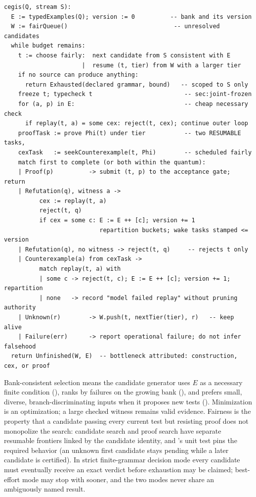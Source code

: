 \begin{lstlisting}
cegis(Q, stream S):
  E := typedExamples(Q); version := 0          -- bank and its version
  W := fairQueue()                              -- unresolved candidates
  while budget remains:
    t := choose fairly:  next candidate from S consistent with E
                      |  resume (t, tier) from W with a larger tier
    if no source can produce anything:
      return Exhausted(declared grammar, bound)   -- scoped to S only
    freeze t; typecheck t                          -- sec:joint-frozen
    for (a, p) in E:                               -- cheap necessary check
      if replay(t, a) = some cex: reject(t, cex); continue outer loop
    proofTask := prove Phi(t) under tier           -- two RESUMABLE tasks,
    cexTask   := seekCounterexample(t, Phi)        -- scheduled fairly
    match first to complete (or both within the quantum):
    | Proof(p)          -> submit (t, p) to the acceptance gate; return
    | Refutation(q), witness a ->
          cex := replay(t, a)
          reject(t, q)
          if cex = some c: E := E ++ [c]; version += 1
                           repartition buckets; wake tasks stamped <= version
    | Refutation(q), no witness -> reject(t, q)     -- rejects t only
    | Counterexample(a) from cexTask ->
          match replay(t, a) with
          | some c -> reject(t, c); E := E ++ [c]; version += 1; repartition
          | none   -> record "model failed replay" without pruning authority
    | Unknown(r)        -> W.push(t, nextTier(tier), r)   -- keep alive
    | Failure(err)      -> report operational failure; do not infer falsehood
  return Unfinished(W, E)  -- bottleneck attributed: construction, cex, or proof
\end{lstlisting}

Bank-consistent selection means the candidate generator uses $E$ as a necessary finite condition (), ranks by failures on the growing bank (), and prefers small, diverse, branch-discriminating inputs when it proposes new tests (). Minimization is an optimization; a large checked witness remains valid evidence. Fairness is the property that a candidate passing every current test but resisting proof does not monopolize the search: candidate search and proof search have separate resumable frontiers linked by the candidate identity, and 's unit test  pins the required behavior (an unknown first candidate stays pending while a later candidate is certified). In strict finite-grammar decision mode every candidate must eventually receive an exact verdict before exhaustion may be claimed; best-effort mode may stop with  sooner, and the two modes never share an ambiguously named result.

